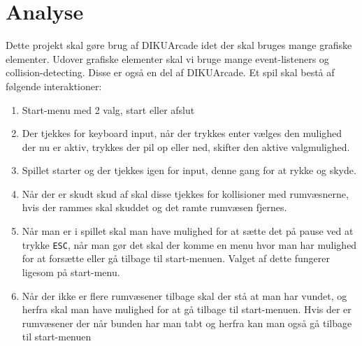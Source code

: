 \section{Analyse}
Dette projekt skal gøre brug af DIKUArcade idet der skal bruges mange grafiske elementer. Udover grafiske elementer skal vi bruge mange event-listeners og collision-detecting. Disse er også en del af DIKUArcade. Et spil skal bestå af følgende interaktioner:
\begin{enumerate}
  \item Start-menu med 2 valg, start eller afslut
  \item Der tjekkes for keyboard input, når der trykkes enter vælges den mulighed der nu er aktiv, trykkes der pil op eller ned, skifter den aktive valgmulighed.
  \item Spillet starter og der tjekkes igen for input, denne gang for at rykke og skyde.
  \item Når der er skudt skud af skal disse tjekkes for kollisioner med rum\-væsnerne, hvis der rammes skal skuddet og det ramte rumvæsen fjernes.
  \item Når man er i spillet skal man have mulighed for at sætte det på pause ved at trykke \texttt{ESC}, når man gør det skal der komme en menu hvor man har mulighed for at forsætte eller gå tilbage til start-menuen. Valget af dette fungerer ligesom på start-menu.
  \item Når der ikke er flere rumvæsener tilbage skal der stå at man har vundet, og herfra skal man have mulighed for at gå tilbage til start-menuen. Hvis der er rumvæsener der når bunden har man tabt og herfra kan man også gå tilbage til start-menuen
\end{enumerate}
